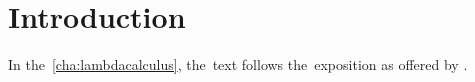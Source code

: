 \chapter*{Introduction}

In the~\autoref{cha:lambdacalculus}, the~text follows the~exposition as offered
by \citet{hindley_seldin_2008}.

